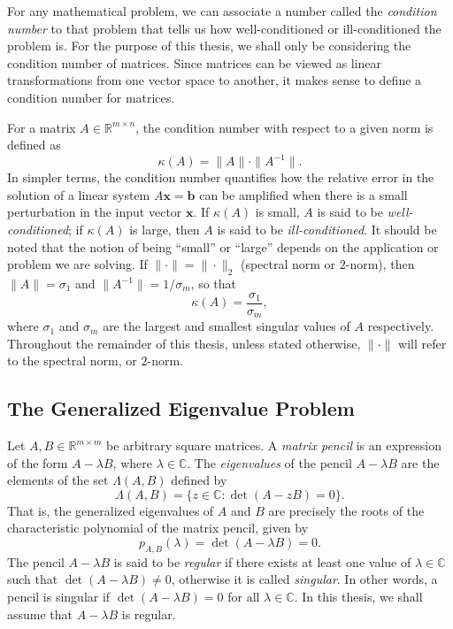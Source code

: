 For any mathematical problem, we can associate a number called the \textit{condition number} to that problem that tells us how well-conditioned or ill-conditioned the problem is. For the purpose of this thesis, we shall only be considering the condition number of matrices. Since matrices can be viewed as linear transformations from one vector space to another, it makes sense to define a condition number for matrices.

For a matrix $A \in \mathbb{R}^{m\times n}$, the condition number with respect to a given norm is defined as
\begin{equation}\label{eq:ConditionNoOfAMatrix}
	\kappa(A) = \|A\| \cdot \|A^{-1}\|.
\end{equation}
In simpler terms, the condition number quantifies how the relative error in the solution of a linear system $A\mathbf{x} = \mathbf{b}$ can be amplified when there is a small perturbation in the input vector $\mathbf{x}$. If $\kappa(A)$ is small, $A$ is said to be \textit{well-conditioned}; if $\kappa(A)$ is large, then $A$ is said to be \textit{ill-conditioned}. It should be noted that the notion of being ``small'' or ``large'' depends on the application or problem we are solving. If $\| \cdot\| = \| \cdot \|_2$ (spectral norm or $2$-norm), then $\|A\| = \sigma_1$ and $\| A^{-1} \| = 1/\sigma_m$, so that
\begin{equation}\label{eq:ConditionNoWithSingularVal}
	\kappa(A) = \frac{\sigma_1}{\sigma_m},
\end{equation}
where $\sigma_1$ and $\sigma_m$ are the largest and smallest singular values of $A$ respectively. Throughout the remainder of this thesis, unless stated otherwise, $\| \cdot \|$ will refer to the spectral norm, or $2$-norm.

\subsection{The Generalized Eigenvalue Problem}\label{sec:GeneralizedEigValProblem}

Let $A, B \in \mathbb{R}^{m\times m}$ be arbitrary square matrices. A \textit{matrix pencil} is an expression of the form $A - \lambda B$, where $\lambda \in \mathbb{C}$. The \textit{eigenvalues} of the pencil $A - \lambda B$ are the elements of the set $\Lambda(A, B)$ defined by
\begin{equation}\label{eq:GeneralizedEigValDefinition}
	\Lambda(A, B) = \{z \in \mathbb{C}: \det(A-zB) = 0\}.
\end{equation}
That is, the generalized eigenvalues of $A$ and $B$ are precisely the roots of the characteristic polynomial of the matrix pencil, given by
\begin{equation}\label{eq:GeneralizedXteristicPolynomial}
	p_{A, B}(\lambda) = \det(A-\lambda B) = 0.
\end{equation}
The pencil $A- \lambda B$ is said to be \textit{regular} if there exists at least one value of $\lambda \in \mathbb{C}$ such that $\det(A-\lambda B) \neq 0$, otherwise it is called \textit{singular}. In other words, a pencil is singular if $\det(A-\lambda B) = 0$ for all $\lambda \in \mathbb{C}$. In this thesis, we shall assume that $A-\lambda B$ is regular.

